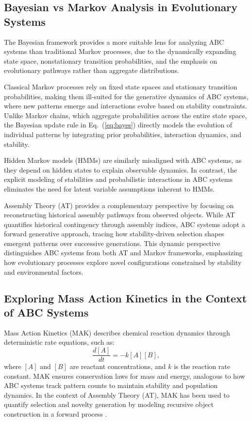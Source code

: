 \documentclass[entropy,article,submit,pdftex,oneauthor]{Definitions/mdpi}
\begin{document}
\subsection{Bayesian vs Markov Analysis in Evolutionary Systems}

The Bayesian framework provides a more suitable lens for analyzing ABC systems than traditional Markov processes, due to the dynamically expanding state space, nonstationary transition probabilities, and the emphasis on evolutionary pathways rather than aggregate distributions. 

Classical Markov processes \cite{norris1997markov} rely on fixed state spaces and stationary transition probabilities, making them ill-suited for the generative dynamics of ABC systems, where new patterns emerge and interactions evolve based on stability constraints. Unlike Markov chains, which aggregate probabilities across the entire state space, the Bayesian update rule in Eq.~(\ref{eq:bayes}) directly models the evolution of individual patterns by integrating prior probabilities, interaction dynamics, and stability.

Hidden Markov models (HMMs) \cite{rabiner1989hmm} are similarly misaligned with ABC systems, as they depend on hidden states to explain observable dynamics. In contrast, the explicit modeling of stabilities and probabilistic interactions in ABC systems eliminates the need for latent variable assumptions inherent to HMMs.

Assembly Theory (AT) provides a complementary perspective by focusing on reconstructing historical assembly pathways from observed objects. While AT quantifies historical contingency through assembly indices, ABC systems adopt a forward generative approach, tracing how stability-driven selection shapes emergent patterns over successive generations. This dynamic perspective distinguishes ABC systems from both AT and Markov frameworks, emphasizing how evolutionary processes explore novel configurations constrained by stability and environmental factors.

\subsection{Exploring Mass Action Kinetics in the Context of ABC Systems}

Mass Action Kinetics (MAK) \cite{TuranyiTomlin2014} describes chemical reaction dynamics through deterministic rate equations, such as:
\begin{equation}
\frac{d[A]}{dt} = -k[A][B],
\end{equation}
where \( [A] \) and \( [B] \) are reactant concentrations, and \( k \) is the reaction rate constant. MAK ensures conservation laws for mass and energy, analogous to how ABC systems track pattern counts to maintain stability and population dynamics. In the context of Assembly Theory (AT), MAK has been used to quantify selection and novelty generation by modeling recursive object construction in a forward process \cite{walker2023nature}.
\end{document}
